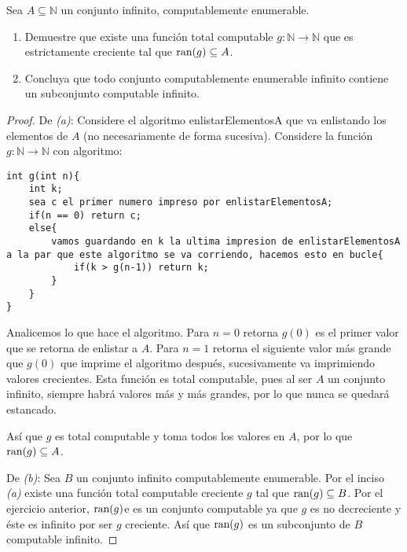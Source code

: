 \documentclass[12pt]{report}
\newcounter{it}
\theoremstyle{largebreak}
\newcommand\cf[3]{\ensuremath{#1:#2\rightarrow#3}}
\begin{document}
    \begin{excer}
        Sea $A\subseteq\mathbb{N}$ un conjunto infinito, computablemente enumerable.
        \begin{enumerate}[label = \textit{(\alph*)}]
            \item Demuestre que existe una función total computable $\cf{g}{\mathbb{N}}{\mathbb{N}}$ que es estrictamente creciente tal que $\textup{ran}(g)\subseteq A$.
            \item Concluya que todo conjunto computablemente enumerable infinito contiene un subconjunto computable infinito.
        \end{enumerate}
    \end{excer}

    \begin{proof}
        De \textit{(a)}: Considere el algoritmo {\selectfont enlistarElementosA} que va enlistando los elementos de $A$ (no necesariamente de forma sucesiva). Considere la función $\cf{g}{\mathbb{N}}{\mathbb{N}}$ con algoritmo:
        \begin{lstlisting}
int g(int n){
    int k;
    sea c el primer numero impreso por enlistarElementosA;
    if(n == 0) return c;
    else{
        vamos guardando en k la ultima impresion de enlistarElementosA a la par que este algoritmo se va corriendo, hacemos esto en bucle{
            if(k > g(n-1)) return k;
        }
    }
}
        \end{lstlisting}
        Analicemos lo que hace el algoritmo. Para $n=0$ retorna $g(0)$ es el primer valor que se retorna de enlistar a $A$. Para $n=1$ retorna el siguiente valor más grande que $g(0)$ que imprime el algoritmo después, sucesivamente va imprimiendo valores crecientes. Esta función es total computable, pues al ser $A$ un conjunto infinito, siempre habrá valores más y más grandes, por lo que nunca se quedará estancado.

        Así que $g$ es total computable y toma todos los valores en $A$, por lo que $\textup{ran}(g)\subseteq A$.

        De \textit{(b)}: Sea $B$ un conjunto infinito computablemente enumerable. Por el inciso \textit{(a)} existe una función total computable creciente $g$ tal que $\textup{ran}(g)\subseteq B$. Por el ejercicio anterior, $\textup{ran}(g)$e es un conjunto computable ya que $g$ es no decreciente y éste es infinito por ser $g$ creciente. Así que $\textup{ran}(g)$ es un subconjunto de $B$ computable infinito.
    \end{proof}
\end{document}
